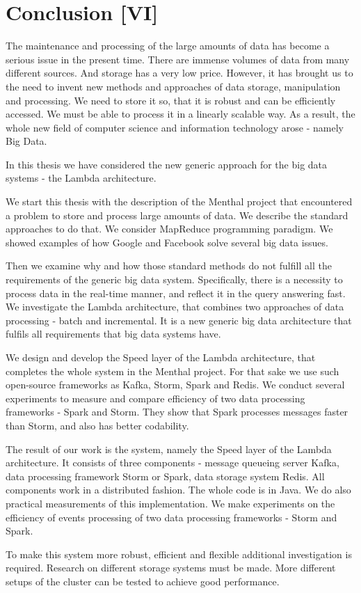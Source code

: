 \chapter{Conclusion [VI]}
\label{chap:conclusion}

The maintenance and processing of the large amounts of data has become a serious issue in the present time.
There are immense volumes of data from many different sources.
And storage has a very low price.
However, it has brought us to the need to invent new methods and approaches of data storage, manipulation and processing.
We need to store it so, that it is robust and can be efficiently accessed.
We must be able to process it in a linearly scalable way.
As a result, the whole new field of computer science and information technology arose - namely Big Data.

In this thesis we have considered the new generic approach for the big data systems - the Lambda architecture.

We start this thesis with the description of the Menthal project that encountered a problem to store and process large amounts of data.
We describe the standard approaches to do that.
We consider MapReduce programming paradigm.
We showed examples of how Google and Facebook solve several big data issues.

Then we examine why and how those standard methods do not fulfill all the requirements of the generic big data system.
Specifically, there is a necessity to process data in the real-time manner, and reflect it in the query answering fast.
We investigate the Lambda architecture, that combines two approaches of data processing - batch and incremental.
It is a new generic big data architecture that fulfils all requirements that big data systems have.

We design and develop the Speed layer of the Lambda architecture, that completes the whole system in the Menthal project.
For that sake we use such open-source frameworks as Kafka, Storm, Spark and Redis.
We conduct several experiments to measure and compare efficiency of two data processing frameworks - Spark and Storm.
They show that Spark processes messages faster than Storm, and also has better codability.

The result of our work is the system, namely the Speed layer of the Lambda architecture.
It consists of three components - message queueing server Kafka, data processing framework Storm or Spark, data storage system Redis.
All components work in a distributed fashion.
The whole code is in Java. 
We do also practical measurements of this implementation.
We make experiments on the efficiency of events processing of two data processing frameworks - Storm and Spark.

To make this system more robust, efficient and flexible additional investigation is required.
Research on different storage systems must be made.
More different setups of the cluster can be tested to achieve good performance.